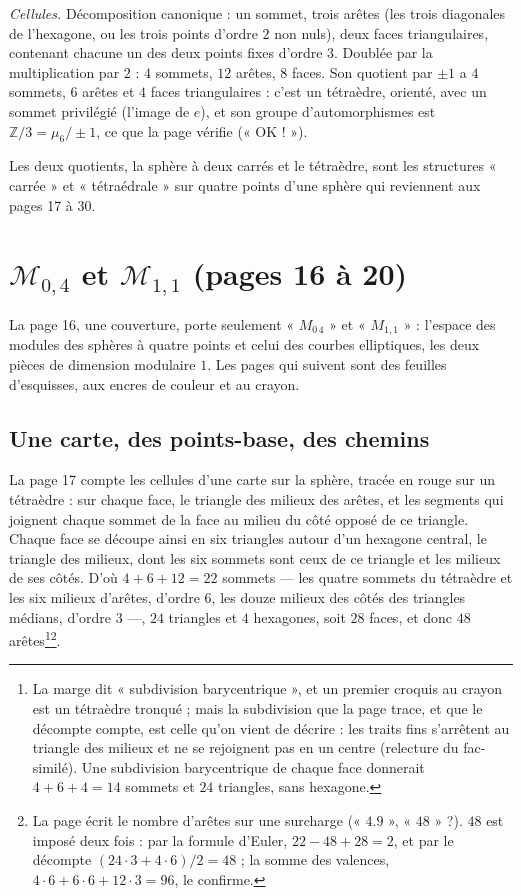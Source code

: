 \documentclass[11pt,a4paper]{article}
\begin{document}
\emph{Cellules.} Décomposition canonique : un sommet, trois arêtes (les trois
diagonales de l'hexagone, ou les trois points d'ordre $2$ non nuls), deux faces
triangulaires, contenant chacune un des deux points fixes d'ordre $3$. Doublée
par la multiplication par $2$ : $4$ sommets, $12$ arêtes, $8$ faces. Son
quotient par $\pm 1$ a $4$ sommets, $6$ arêtes et $4$ faces triangulaires :
c'est un tétraèdre, orienté, avec un sommet privilégié (l'image de $e$), et son
groupe d'automorphismes est $\mathbb{Z}/3 = \mu_6/\pm 1$, ce que la page vérifie
(« OK ! »).

Les deux quotients, la sphère à deux carrés et le tétraèdre, sont les
structures « carrée » et « tétraédrale » sur quatre points d'une sphère qui
reviennent aux pages 17 à 30.

\section*{$\mathcal{M}_{0,4}$ et $\mathcal{M}_{1,1}$ (pages 16 à 20)}

La page 16, une couverture, porte seulement « $M_{0\,4}$ » et « $M_{1,1}$ » :
l'espace des modules des sphères à quatre points et celui des courbes
elliptiques, les deux pièces de dimension modulaire $1$. Les pages qui suivent
sont des feuilles d'esquisses, aux encres de couleur et au crayon.

\subsection*{Une carte, des points-base, des chemins}

La page 17 compte les cellules d'une carte sur la sphère, tracée en rouge
sur un tétraèdre : sur chaque face, le triangle des milieux des arêtes, et
les segments qui joignent chaque sommet de la face au milieu du côté opposé
de ce triangle. Chaque face se découpe ainsi en six triangles autour d'un
hexagone central, le triangle des milieux, dont les six sommets sont ceux de
ce triangle et les milieux de ses côtés. D'où $4 + 6 + 12 = 22$ sommets ---
les quatre sommets du tétraèdre et les six milieux d'arêtes, d'ordre $6$,
les douze milieux des côtés des triangles médians, d'ordre $3$ ---, $24$
triangles et $4$ hexagones, soit $28$ faces, et donc $48$
arêtes\footnote{La marge dit « subdivision barycentrique », et un premier
croquis au crayon est un tétraèdre tronqué ; mais la subdivision que la page
trace, et que le décompte compte, est celle qu'on vient de décrire : les
traits fins s'arrêtent au triangle des milieux et ne se rejoignent pas en un
centre (relecture du fac-similé). Une subdivision barycentrique de chaque face
donnerait $4 + 6 + 4 = 14$ sommets et $24$ triangles, sans hexagone.}\footnote{La page écrit le
nombre d'arêtes sur une surcharge (« $4.9$ », « $48$ » ?). $48$ est imposé
deux fois : par la formule d'Euler, $22 - 48 + 28 = 2$, et par le décompte
$(24 \cdot 3 + 4 \cdot 6)/2 = 48$ ; la somme des valences, $4\cdot 6 + 6\cdot 6
+ 12 \cdot 3 = 96$, le confirme.}.
\end{document}
